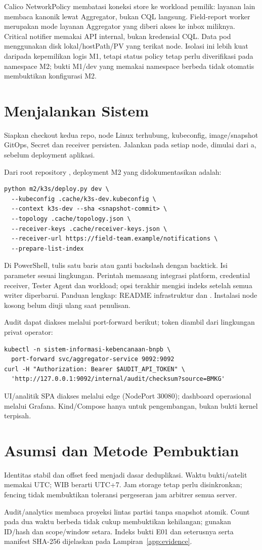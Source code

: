 Calico NetworkPolicy membatasi koneksi store ke workload pemilik: layanan lain membaca kanonik lewat Aggregator, bukan CQL langsung. Field-report worker merupakan mode layanan Aggregator yang diberi akses ke inbox miliknya. Critical notifier memakai API internal, bukan kredensial CQL. Data pod  menggunakan disk lokal/hostPath/PV yang terikat node. Isolasi ini lebih kuat daripada kepemilikan logis M1, tetapi status policy tetap perlu diverifikasi pada namespace M2; bukti M1/dev yang memakai namespace berbeda tidak otomatis membuktikan konfigurasi M2.

\section{Menjalankan Sistem}
Siapkan checkout kedua repo, node Linux terhubung, kubeconfig, image/snapshot GitOps, Secret dan receiver persisten. Jalankan  pada setiap node, dimulai dari a, sebelum deployment aplikasi.

Dari root repository , deployment M2 yang didokumentasikan adalah:
\begin{lstlisting}
python m2/k3s/deploy.py dev \
  --kubeconfig .cache/k3s-dev.kubeconfig \
  --context k3s-dev --sha <snapshot-commit> \
  --topology .cache/topology.json \
  --receiver-keys .cache/receiver-keys.json \
  --receiver-url https://field-team.example/notifications \
  --prepare-list-index
\end{lstlisting}
Di PowerShell, tulis satu baris atau ganti backslash dengan backtick. Isi parameter sesuai lingkungan. Perintah memasang integrasi platform, credential receiver, Tester Agent dan workload; opsi terakhir mengisi indeks setelah semua writer diperbarui. Panduan lengkap: README infrastruktur dan . Instalasi node kosong belum diuji ulang saat penulisan.

Audit dapat diakses melalui port-forward berikut; token diambil dari lingkungan privat operator:
\begin{lstlisting}
kubectl -n sistem-informasi-kebencanaan-bnpb \
  port-forward svc/aggregator-service 9092:9092
curl -H "Authorization: Bearer $AUDIT_API_TOKEN" \
  'http://127.0.0.1:9092/internal/audit/checksum?source=BMKG'
\end{lstlisting}
UI/analitik SPA diakses melalui edge (NodePort 30080); dashboard operasional melalui Grafana. Kind/Compose hanya untuk pengembangan, bukan bukti kernel terpisah.

\section{Asumsi dan Metode Pembuktian}
Identitas stabil dan offset feed menjadi dasar deduplikasi. Waktu bukti/satelit memakai UTC; WIB berarti UTC+7. Jam storage tetap perlu disinkronkan; fencing tidak membuktikan toleransi pergeseran jam arbitrer semua server.

Audit/analytics membaca proyeksi lintas partisi tanpa snapshot atomik. Count pada dua waktu berbeda tidak cukup membuktikan kehilangan; gunakan ID/hash dan scope/window setara. Indeks bukti E01 dan seterusnya serta manifest SHA-256 dijelaskan pada Lampiran~\ref{app:evidence}.
